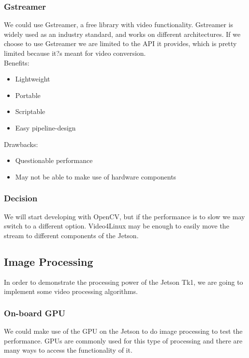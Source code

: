 	\subsubsection{Gstreamer}
	We could use Gstreamer, a free library with video functionality.
Gstreamer is widely used as an industry standard, and works on different architectures. If we choose to use Gstreamer we are limited to the API it provides, which is pretty limited because it?s meant for video conversion.\\
			
	Benefits:
	\begin{itemize}[leftmargin=2cm,labelindent=2cm]
		\item Lightweight
		\item Portable
		\item Scriptable
		\item Easy pipeline-design
	\end{itemize}
	
	Drawbacks:
	\begin{itemize}[leftmargin=2cm,labelindent=2cm]
		\item Questionable performance
		\item May not be able to make use of hardware components\\
	\end{itemize}
	
	\subsubsection{Decision}
	We will start developing with OpenCV, but if the performance is to slow we may switch to a different option. Video4Linux may be enough to easily move the stream to different components of the Jetson.
	
\subsection{Image Processing}
In order to demonstrate the processing power of the Jetson Tk1, we are going to implement some video processing algorithms.\\
	\subsubsection{On-board GPU}
	We could make use of the GPU on the Jetson to do image processing to test the performance. GPUs are commonly used for this type of processing and there are many ways to access the functionality of it.
		
